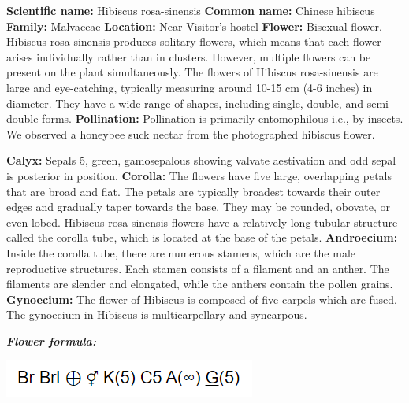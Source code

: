 \documentclass{article}
\begin{document}
\textbf{Scientific name:} Hibiscus rosa-sinensis\newline
\textbf{Common name:} Chinese hibiscus\newline
\textbf{Family:} Malvaceae\newline
\textbf{Location:} Near Visitor's hostel\newline
\textbf{Flower:} Bisexual flower. Hibiscus rosa-sinensis produces solitary flowers, which means that each flower arises individually rather than in clusters. However, multiple flowers can be present on the plant simultaneously. The flowers of Hibiscus rosa-sinensis are large and eye-catching, typically measuring around 10-15 cm (4-6 inches) in diameter. They have a wide range of shapes, including single, double, and semi-double forms. \newline
\textbf{Pollination:} Pollination is primarily entomophilous i.e., by insects.   We observed a honeybee suck nectar from the photographed hibiscus flower.

\text{ }\newline
\textbf{Calyx: }Sepals 5, green, gamosepalous showing valvate aestivation and odd sepal is posterior in position.\newline
\textbf{Corolla:} The flowers have five large, overlapping petals that are broad and flat. The petals are typically broadest towards their outer edges and gradually taper towards the base. They may be rounded, obovate, or even lobed. Hibiscus rosa-sinensis flowers have a relatively long tubular structure called the corolla tube, which is located at the base of the petals. \newline
\textbf{Androecium:} Inside the corolla tube, there are numerous stamens, which are the male reproductive structures. Each stamen consists of a filament and an anther. The filaments are slender and elongated, while the anthers contain the pollen grains.\newline
\textbf{Gynoecium:} The flower of Hibiscus is composed of five carpels which are fused. The gynoecium in Hibiscus is multicarpellary and syncarpous.\newline

\textbf{\textit{Flower formula:}}
\begin{center}
    \includegraphics{images/Screenshot 2023-06-21 235437.png}
\end{center}
\end{document}
